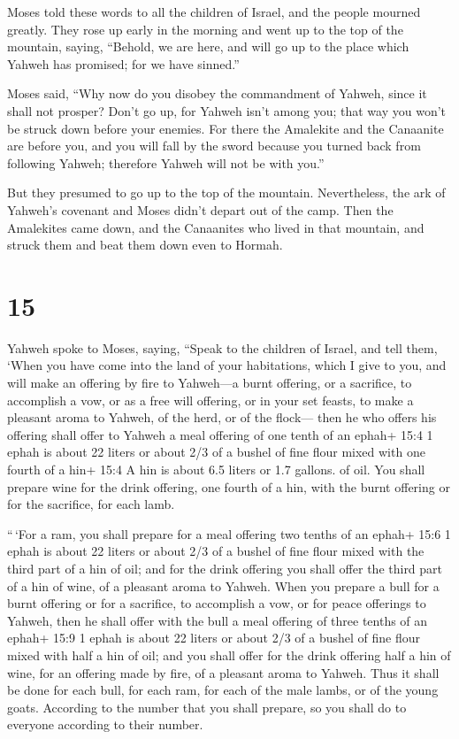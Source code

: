  Moses told these words to all the children of Israel, and
the people mourned greatly.  They rose up early in the
morning and went up to the top of the mountain, saying, ``Behold, we are
here, and will go up to the place which Yahweh has promised; for we have
sinned.''

 Moses said, ``Why now do you disobey the commandment of
Yahweh, since it shall not prosper?  Don't go up, for
Yahweh isn't among you; that way you won't be struck down before your
enemies.  For there the Amalekite and the Canaanite are
before you, and you will fall by the sword because you turned back from
following Yahweh; therefore Yahweh will not be with you.''

 But they presumed to go up to the top of the mountain.
Nevertheless, the ark of Yahweh's covenant and Moses didn't depart out
of the camp.  Then the Amalekites came down, and the
Canaanites who lived in that mountain, and struck them and beat them
down even to Hormah.

\hypertarget{section-14}{%
\section{15}\label{section-14}}

 Yahweh spoke to Moses, saying,  ``Speak to the
children of Israel, and tell them, `When you have come into the land of
your habitations, which I give to you,  and will make an
offering by fire to Yahweh---a burnt offering, or a sacrifice, to
accomplish a vow, or as a free will offering, or in your set feasts, to
make a pleasant aroma to Yahweh, of the herd, or of the flock---
 then he who offers his offering shall offer to Yahweh a
meal offering of one tenth of an ephah+ 15:4 1 ephah is about 22 liters
or about 2/3 of a bushel of fine flour mixed with one fourth of a hin+
15:4 A hin is about 6.5 liters or 1.7 gallons. of oil.  You
shall prepare wine for the drink offering, one fourth of a hin, with the
burnt offering or for the sacrifice, for each lamb.

 ``\,`For a ram, you shall prepare for a meal offering two
tenths of an ephah+ 15:6 1 ephah is about 22 liters or about 2/3 of a
bushel of fine flour mixed with the third part of a hin of oil;
 and for the drink offering you shall offer the third part
of a hin of wine, of a pleasant aroma to Yahweh.  When you
prepare a bull for a burnt offering or for a sacrifice, to accomplish a
vow, or for peace offerings to Yahweh,  then he shall offer
with the bull a meal offering of three tenths of an ephah+ 15:9 1 ephah
is about 22 liters or about 2/3 of a bushel of fine flour mixed with
half a hin of oil;  and you shall offer for the drink
offering half a hin of wine, for an offering made by fire, of a pleasant
aroma to Yahweh.  Thus it shall be done for each bull, for
each ram, for each of the male lambs, or of the young goats.
 According to the number that you shall prepare, so you
shall do to everyone according to their number.

